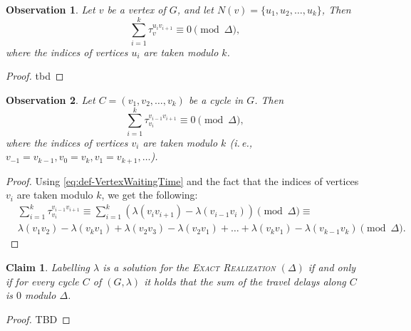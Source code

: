 \documentclass[11pt,a4paper]{article}
\newtheorem{observation}{Observation}
\newtheorem{claim}[theorem]{Claim}
\theoremstyle{remark}
\theoremstyle{definition}
\newcommand{\ie}{i.\,e.,\ }
\begin{document}
    \begin{observation} \label{obs:exact-VertexSum}
    Let $v$ be a vertex of $G$, and let $N(v)=\{u_1, u_2, \ldots, u_k\}$, Then 
    \begin{equation*}
        \sum_{i = 1}^k \tau_{v}^{u_{i}v_{i+1}} \equiv  0 \pmod \Delta,
    \end{equation*}
    where the indices of vertices $u_i$ are taken modulo $k$.
    \end{observation}

    \begin{proof}
        tbd
    \end{proof}


\begin{observation} \label{obs:exact-CyclesSum}
    Let $C = (v_1, v_2, \dots, v_k)$ be a cycle in $G$.
    Then 
    \begin{equation*}
        \sum_{i = 1}^k \tau_{v_i}^{v_{i-1}v_{i+1}} \equiv  0 \pmod \Delta,
    \end{equation*}
    where the indices of vertices $v_i$ are taken modulo $k$ (\ie $v_{-1}=v_{k-1}, v_0 = v_k, v_1 = v_{k+1}, \dots$).
    \end{observation}
    
    
    \begin{proof}
        Using \cref{eq:def-VertexWaitingTime} and the fact that the indices of vertices $v_i$ are taken modulo $k$, we get the following:
        \begin{align*}
            &\sum_{i = 1}^k \tau_{v_i}^{v_{i-1}v_{i+1}}  \equiv  
            \sum_{i = 1}^k  ( \lambda(v_i v_{i+1}) - \lambda (v_{i-1} v_i) ) \pmod \Delta \equiv \\
            &\lambda(v_1 v_2) - \lambda(v_{k}v_1) + \lambda(v_2 v_3) - \lambda(v_2 v_1) + \dots + \lambda(v_k v_1) - \lambda(v_{k-1}v_k) \pmod \Delta.
        \end{align*}
    \end{proof}
    
    \begin{claim}
    Labelling $\lambda$ is a solution for the \textsc{Exact Realization $(\Delta)$} if and only if
    for every cycle $C$ of $(G,\lambda)$ it holds that the sum of the travel delays along $C$ is $0$ modulo $\Delta$.
    \end{claim}
    
    \begin{proof}
        TBD
    \end{proof}
    
\end{document}

